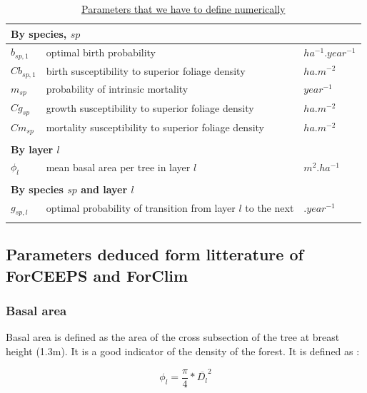 \documentclass{article}
\begin{document}
\begin{table}[H]
    \centering
    \begin{tabular}{l l l}
    \hline
    \hline
    \multicolumn{3}{l}{\textbf{By species}, $sp$} \\
    \hline
    $b_{sp,1}$     & optimal birth probability                              & $ha^{-1}.year^{-1}$ \\
    $Cb_{sp,1}$    & birth susceptibility to superior foliage density       & $ha.m^{-2}$       \\
    $m_{sp}$       & probability of intrinsic mortality                     & $year^{-1}$ \\
    $Cg_{sp}$      & growth susceptibility to superior foliage density      & $ha.m^{-2}$           \\
    $Cm_{sp}$      & mortality susceptibility to superior foliage density   & $ha.m^{-2}$           \\    
    \\
    \multicolumn{3}{l}{\textbf{By layer $l$}} \\
    \hline
    $\phi_{l}$  & mean basal area per tree in layer $l$        & $m^{2}.ha^{-1}$  \\
    \\
    \multicolumn{3}{l}{\textbf{By species $sp$ and layer $l$}} \\
    \hline
    $g_{sp,l}$     & optimal probability of transition from layer $l$ to the next & $.year^{-1}$ \\
    \\
    \hline
    \hline
    \end{tabular}
    \caption{\underline{Parameters that we have to define numerically}}
    \label{tab:coeftoparam} 
\end{table}

\subsection{Parameters deduced form litterature of ForCEEPS and ForClim}

\subsubsection{Basal area}

Basal area is defined as the area of the cross subsection of the tree at breast height (1.3m). It is a good indicator of the density of the forest. It is defined as : 

\begin{equation}
    \phi_{l} = \frac{\pi}{4} * \overline{D_{l}}^2
\end{equation}
\end{document}
